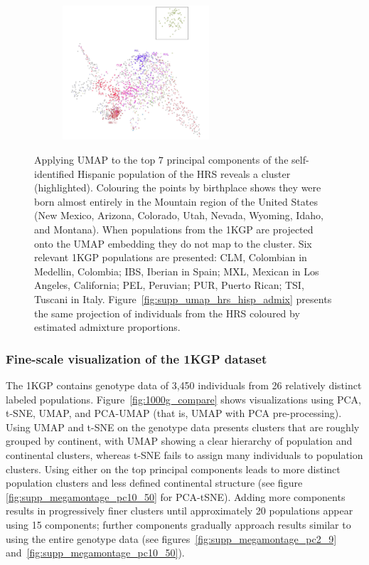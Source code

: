 \documentclass[12pt]{pnas-new}
\begin{document}
\begin{figure}
    \centering
    \begin{subfigure}{\textwidth}
    \includegraphics[width=0.6\textwidth]{images/HRS_1000G_NP1_UMAP_PC7_NC2_NN15_MD05_pca_hrshisp_added1kgp_2018115153245_1kgp_hisp.pdf}
    \end{subfigure}
    \caption{Applying UMAP to the top $7$ principal components of the self-identified Hispanic population of the HRS reveals a cluster (highlighted). Colouring the points by birthplace shows they were born almost entirely in the Mountain region of the United States (New Mexico, Arizona, Colorado, Utah, Nevada, Wyoming, Idaho, and Montana). When populations from the 1KGP are projected onto the UMAP embedding they do not map to the cluster. Six relevant 1KGP populations are presented: CLM, Colombian in Medellin, Colombia;
    IBS, Iberian in Spain;
    MXL, Mexican in Los Angeles, California;
    PEL, Peruvian;
    PUR, Puerto Rican;
    TSI, Tuscani in Italy. Figure~\ref{fig:supp_umap_hrs_hisp_admix} presents the same projection of individuals from the HRS coloured by estimated admixture proportions.}
    \label{fig:supp_umap_hrs_hisp_1kgp_hisp}
\end{figure}

\subsubsection*{Fine-scale visualization of the 1KGP dataset} The 1KGP contains genotype data of 3,450 individuals from 26 relatively distinct labeled populations\cite{10002015global}. Figure~\ref{fig:1000g_compare} shows visualizations using PCA, t-SNE, UMAP, and PCA-UMAP (that is, UMAP with PCA pre-processing). Using UMAP and t-SNE on the genotype data presents clusters that are roughly grouped by continent, with UMAP showing a clear hierarchy of population and continental clusters, whereas t-SNE fails to assign many individuals to population clusters. Using either on the top principal components leads to more distinct population clusters and less defined continental structure (see figure \ref{fig:supp_megamontage_pc10_50} for PCA-tSNE). Adding more components results in progressively finer clusters until approximately 20 populations appear using 15 components; further components gradually approach results similar to using the entire genotype data (see figures~\ref{fig:supp_megamontage_pc2_9} and~\ref{fig:supp_megamontage_pc10_50}). 
\end{document}
